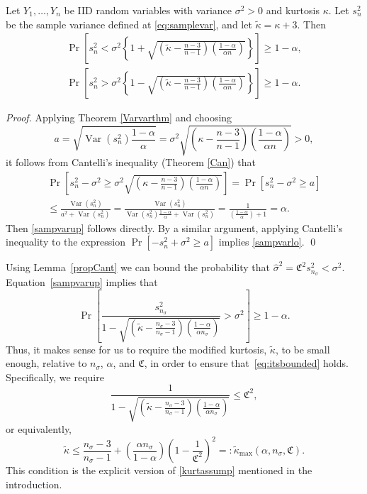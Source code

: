 \documentclass[graybox]{svmult}
\newcommand{\fudge}{\mathfrak{C}}
\newcommand{\Prob}{\Pr}
\DeclareMathOperator{\var}{Var}
\newcommand{\tkappa}{\tilde{\kappa}}
\begin{document}
\begin{lemma}\label{propCant} 
Let $Y_1,\dots,Y_n$ be IID random variables with variance
$\sigma^2>0$ and kurtosis $\kappa$.
Let $s^2_n$ be the sample variance 
defined at \eqref{eq:samplevar}, and let $\tilde\kappa=\kappa+3$.  Then
\begin{subequations} \label{sampvarbd}
\begin{gather}\label{sampvarup}
\Prob\left[s^2_n < \sigma^2 \left\{1 + \sqrt{\left ( \tilde\kappa  - \frac{n-3}{n-1}\right)\left(\frac{1-\alpha}{\alpha n}\right)}\right\} \right] \ge 1 - \alpha, \\
\label{sampvarlo}
\Prob\left[s^2_n > \sigma^2 \left\{1 - \sqrt{\left ( \tilde\kappa  - \frac{n-3}{n-1}\right)\left(\frac{1-\alpha}{\alpha n}\right)}\right\} \right] \ge 1 - \alpha.
\end{gather}
\end{subequations}
\end{lemma}
\begin{proof} Applying Theorem \ref{Varvarthm} and choosing
$$a=\sqrt{\var(s^2_n) \frac{1-\alpha}{\alpha} } = \sigma^2\sqrt{\left(\kappa-\frac{n-3}{n-1}\right)\left(\frac{1-\alpha}{\alpha n}\right)} >0,
$$
it follows from Cantelli's inequality (Theorem  \ref{Can})  that
\begin{multline*}
\Prob\left[s^2_n-\sigma^2 \geq
\sigma^2\sqrt{\left(\kappa-\frac{n-3}{n-1}\right)\left(\frac{1-\alpha}{\alpha n}\right)} \right]  = \Prob\left[s^2_n-\sigma^2 \geq
a \right]\\
 \leq \frac{\var(s^2_n)}{a^2+\var(s^2_n)} 
=\frac{\var(s^2_n)}{\var(s^2_n) \frac{1-\alpha}{\alpha}+\var(s^2_n)}  
=\frac{1}{\left(\frac{1-\alpha}{\alpha}\right)+1}=\alpha.
\end{multline*}
Then \eqref{sampvarup} follows directly.  By a similar argument, applying Cantelli's inequality to the expression $\Prob\left[-s^2_n+\sigma^2 \ge a \right]$ implies  \eqref{sampvarlo}. \qed
\end{proof}

Using Lemma~\ref{propCant} we can bound the probability
that $\hat\sigma^2 = \fudge^2 s^2_{n_\sigma}<\sigma^2$.
Equation~\eqref{sampvarup} implies that
\begin{equation}\label{eq:itsbounded}
\Prob \left[\frac{s^2_{n_{\sigma}}}{1 - \sqrt{\left ( \tilde\kappa  - \frac{n_{\sigma}-3}{n_{\sigma}-1}\right)\left(\frac{1-\alpha}{\alpha n_{\sigma}}\right)}} > \sigma^2 \right] \ge 1 - \alpha.
\end{equation}
Thus, it makes sense for us to require the modified kurtosis, $\tkappa$, to be small enough, relative to $n_{\sigma}$, $\alpha$, and $\fudge$, in order to ensure 
that~\eqref{eq:itsbounded} holds. Specifically, we require
$$
\frac{1}{1 - \sqrt{\left ( \tilde\kappa  - \frac{n_{\sigma}-3}{n_{\sigma}-1}\right)\left(\frac{1-\alpha}{\alpha n_{\sigma}}\right)}} \le \fudge^2,
$$
or equivalently,
\begin{equation}
\label{kappamaxdef}
\tilde\kappa \le \frac{n_{\sigma}-3}{n_{\sigma}-1} + \left(\frac{ \alpha n_{\sigma}}{1-\alpha}\right) \left(1 - \frac{1}{\fudge^2}\right)^2 =: \tilde\kappa_{\max} (\alpha,n_{\sigma},\fudge). 
\end{equation}
This condition is the explicit version of \eqref{kurtassump} mentioned in the introduction.
\end{document}
